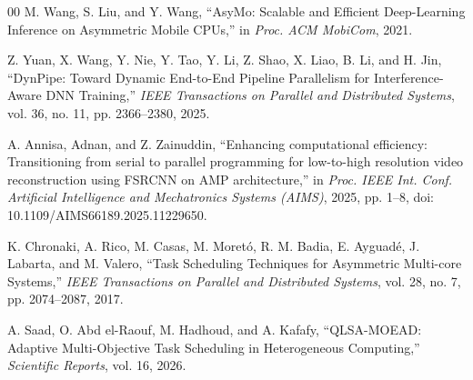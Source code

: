 \documentclass[conference]{IEEEtran}
\begin{document}
\begin{thebibliography}{00}
M. Wang, S. Liu, and Y. Wang, ``AsyMo: Scalable and Efficient Deep-Learning Inference on Asymmetric Mobile CPUs,'' in \textit{Proc. ACM MobiCom}, 2021.

Z. Yuan, X. Wang, Y. Nie, Y. Tao, Y. Li, Z. Shao, X. Liao, B. Li, and H. Jin, ``DynPipe: Toward Dynamic End-to-End Pipeline Parallelism for Interference-Aware DNN Training,'' \textit{IEEE Transactions on Parallel and Distributed Systems}, vol. 36, no. 11, pp. 2366--2380, 2025.

A. Annisa, Adnan, and Z. Zainuddin, ``Enhancing computational efficiency: Transitioning from serial to parallel programming for low-to-high resolution video reconstruction using FSRCNN on AMP architecture,'' in \textit{Proc. IEEE Int. Conf. Artificial Intelligence and Mechatronics Systems (AIMS)}, 2025, pp. 1--8, doi: 10.1109/AIMS66189.2025.11229650.

K. Chronaki, A. Rico, M. Casas, M. Moretó, R. M. Badia, E. Ayguadé, J. Labarta, and M. Valero, ``Task Scheduling Techniques for Asymmetric Multi-core Systems,'' \textit{IEEE Transactions on Parallel and Distributed Systems}, vol. 28, no. 7, pp. 2074--2087, 2017.

A. Saad, O. Abd el-Raouf, M. Hadhoud, and A. Kafafy, ``QLSA-MOEAD: Adaptive Multi-Objective Task Scheduling in Heterogeneous Computing,'' \textit{Scientific Reports}, vol. 16, 2026.

\end{thebibliography}
\end{document}

